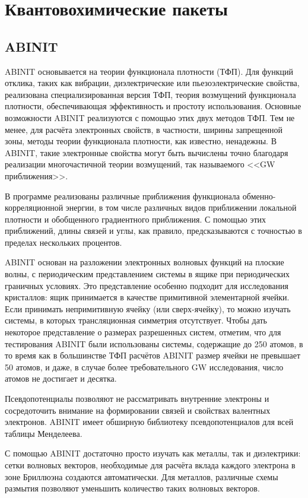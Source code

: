 \chapter{Квантовохимические пакеты}
\section{ABINIT}
ABINIT основывается на теории функционала плотности (ТФП). Для функций отклика, таких как вибрации, диэлектрические или пьезоэлектрические свойства, реализована специализированная версия ТФП, теория возмущений функционала плотности, обеспечивающая эффективность и простоту использования. Основные возможности ABINIT реализуются с помощью этих двух методов ТФП. Тем не менее, для расчёта электронных свойств, в частности, ширины запрещенной зоны, методы теории функционала плотности, как известно, ненадежны. В ABINIT, такие электронные свойства могут быть вычислены точно благодаря реализации многочастичной теории возмущений, так называемого <<GW приближения>>.

В программе реализованы различные приближения функционала обменно-корреляционной энергии, в том числе различных видов приближении локальной плотности и обобщенного градиентного приближения. С помощью этих приближений, длины связей и углы, как правило, предсказываются с точностью в пределах нескольких процентов.

ABINIT основан на разложении электронных волновых функций на плоские волны, с периодическим представлением системы в ящике при периодических граничных условиях. Это представление особенно подходит для исследования кристаллов: ящик принимается в качестве примитивной элементарной ячейки. Если принимать непримитивную ячейку (или сверх-ячейку), то можно изучать системы, в которых трансляционная симметрия отсутствует. Чтобы дать некоторое представление о размерах разрешенных систем, отметим, что для тестирования ABINIT были использованы системы, содержащие до 250 атомов, в то время как в большинстве ТФП расчётов ABINIT размер ячейки не превышает 50 атомов, и даже, в случае более требовательного GW исследования, число атомов не достигает и десятка.

Псевдопотенциалы позволяют не рассматривать внутренние электроны и сосредоточить внимание на формировании связей и свойствах валентных электронов. ABINIT имеет обширную библиотеку псевдопотенциалов для всей таблицы Менделеева.

С помощью ABINIT достаточно просто изучать как металлы, так и диэлектрики: сетки волновых векторов, необходимые для расчёта вклада каждого электрона в зоне Бриллюэна создаются автоматически. Для металлов, различные схемы размытия позволяют уменьшить количество таких волновых векторов.

